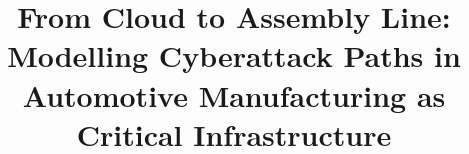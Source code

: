 \documentclass[review,times]{elsarticle}
\begin{document}
\begin{frontmatter}

\title{From Cloud to Assembly Line: Modelling Cyberattack Paths in Automotive
Manufacturing as Critical Infrastructure}

\author[aff1]{\capmauthor{}}
\ead{\capmemail}

\begin{abstract}
\capmabstract
\end{abstract}



\begin{keyword}
\capmkeywords
\end{keyword}

\end{frontmatter}







\end{document}
